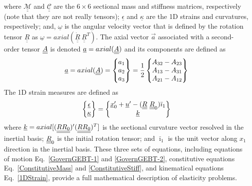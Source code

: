 where $\underline{\underline{\mathcal{M}}}$ and
$\underline{\underline{\mathcal{C}}}$ are the $6 \times 6$ sectional mass
and stiffness matrices, respectively (note that they are not really tensors);
$\underline{\epsilon}$ and $\underline{\kappa}$ are the 1D strains and
curvatures, respectively; and, $\underline{\omega}$ is the angular velocity
vector that is defined by the rotation tensor $\underline{\underline{R}}$ as
$\underline{\omega} =
axial(\dot{\underline{\underline{R}}}~\underline{\underline{R}}^T)$. The axial vector $\vec{a}$ associated with a second-order tensor $\underline{\underline{A}}$ is denoted $\underline{a}=axial(\underline{\underline{A}})$ and its components are defined as
\begin{equation}
    \label{axial}
    \underline{a} = axial(\underline{\underline{A}})=\begin{Bmatrix}
    a_1 \\
    a_2 \\
    a_3
    \end{Bmatrix}
    =\frac{1}{2}
    \begin{Bmatrix}
    A_{32}-A_{23} \\
    A_{13}-A_{31} \\
    A_{21}-A_{12}
    \end{Bmatrix}
\end{equation}
The 1D strain measures are defined as
\begin{equation}
    \label{1DStrain}
    \begin{Bmatrix}
        \underline{\epsilon} \\
        \underline{\kappa}
    \end{Bmatrix}
    =
    \begin{Bmatrix}
        \underline{x}^\prime_0 + \underline{u}^\prime - (\underline{\underline{R}} ~\underline{\underline{R}}_0) \bar{\imath}_1 \\
        \underline{k}
    \end{Bmatrix}
\end{equation}
where $\underline{k} = axial [(\underline{\underline{R R_0}})^\prime (\underline{\underline{R R_0}})^T]$ is the sectional
curvature vector resolved in the inertial basis; $\underline{\underline{R}}_0$ is the initial rotation tensor; and $\bar{\imath}_1$ is the unit
vector along $x_1$ direction in the inertial basis. These
three sets of equations, including equations of motion
Eq.~\eqref{GovernGEBT-1} and \eqref{GovernGEBT-2}, constitutive equations
Eq.~\eqref{ConstitutiveMass} and \eqref{ConstitutiveStiff}, and kinematical
equations Eq.~\eqref{1DStrain}, provide a full mathematical description of elasticity problems. 

